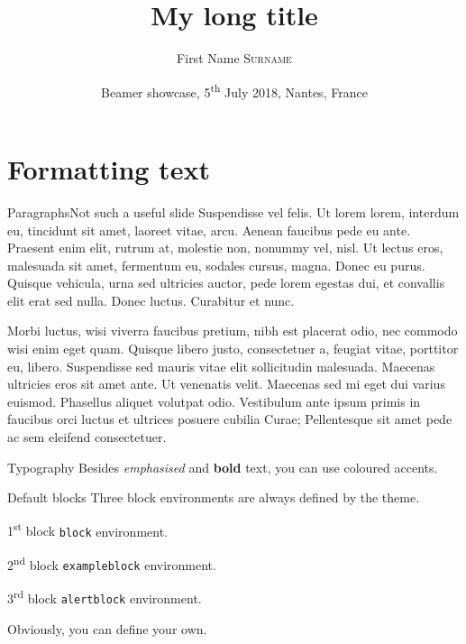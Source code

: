 \documentclass[aspectratio=169%
]{beamer}
\title[My short title]{My long title}
\author[F.\,N. Surname ]{First Name \textsc{Surname}}
\institute[Short affiliation]{My long affiliation}
\date[2018-07-05]{Beamer showcase, 5\textsuperscript{th} July 2018, Nantes, France}
\begin{document}
\maketitle{}



\section{Formatting text}

\begin{frame}{Paragraphs}{Not such a useful slide}
  Suspendisse vel felis. Ut lorem lorem, interdum eu, tincidunt sit amet, laoreet
  vitae, arcu. Aenean faucibus pede eu ante. Praesent enim elit, rutrum at, molestie
  non, nonummy vel, nisl. Ut lectus eros, malesuada sit amet, fermentum eu,
  sodales cursus, magna. Donec eu purus. Quisque vehicula, urna sed ultricies
  auctor, pede lorem egestas dui, et convallis elit erat sed nulla. Donec luctus.
  Curabitur et nunc. 

  Morbi luctus, wisi viverra faucibus pretium, nibh est placerat odio, nec commodo
  wisi enim eget quam. Quisque libero justo, consectetuer a, feugiat vitae, porttitor
  eu, libero. Suspendisse sed mauris vitae elit sollicitudin malesuada. Maecenas
  ultricies eros sit amet ante. Ut venenatis velit. Maecenas sed mi eget dui varius
  euismod. Phasellus aliquet volutpat odio. Vestibulum ante ipsum primis in
  faucibus orci luctus et ultrices posuere cubilia Curae; Pellentesque sit amet pede
  ac sem eleifend consectetuer. 
\end{frame}

\begin{frame}{Typography}
  Besides \emph{emphasised} and \textbf{bold} text, you can use coloured \alert{accents}.
\end{frame}

\begin{frame}{Default blocks}
  Three block environments are always defined by the theme.
  
  \begin{block}{1\textsuperscript{st} block}
    \texttt{block} environment.
  \end{block}
  
  \begin{exampleblock}{2\textsuperscript{nd} block}
    \texttt{exampleblock} environment.
  \end{exampleblock}
  
  \begin{alertblock}{3\textsuperscript{rd} block}
    \texttt{alertblock} environment.
  \end{alertblock}

  Obviously, you can define your own.  
\end{frame}
\end{document}
